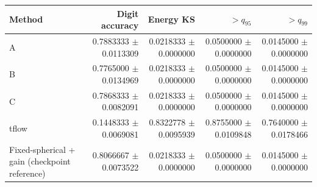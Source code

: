 \begin{tabular}{lrrrr}
\toprule
Method & Digit accuracy & Energy KS & $>q_{95}$ & $>q_{99}$ \\
\midrule
A & 0.7883333 $\pm$ 0.0113309 & 0.0218333 $\pm$ 0.0000000 & 0.0500000 $\pm$ 0.0000000 & 0.0145000 $\pm$ 0.0000000 \\
B & 0.7765000 $\pm$ 0.0134969 & 0.0218333 $\pm$ 0.0000000 & 0.0500000 $\pm$ 0.0000000 & 0.0145000 $\pm$ 0.0000000 \\
C & 0.7868333 $\pm$ 0.0082091 & 0.0218333 $\pm$ 0.0000000 & 0.0500000 $\pm$ 0.0000000 & 0.0145000 $\pm$ 0.0000000 \\
tflow & 0.1448333 $\pm$ 0.0069081 & 0.8322778 $\pm$ 0.0095939 & 0.8755000 $\pm$ 0.0109848 & 0.7640000 $\pm$ 0.0178466 \\
Fixed-spherical + gain (checkpoint reference) & 0.8066667 $\pm$ 0.0073522 & 0.0218333 $\pm$ 0.0000000 & 0.0500000 $\pm$ 0.0000000 & 0.0145000 $\pm$ 0.0000000 \\
\bottomrule
\end{tabular}
